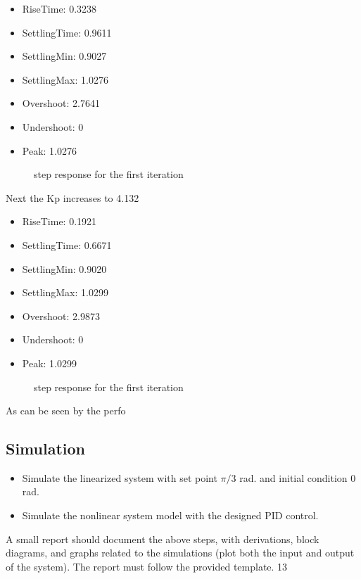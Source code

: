\documentclass[12pt]{article}
\begin{document}
\begin{itemize}
  \item RiseTime: 0.3238
  \item SettlingTime: 0.9611
  \item SettlingMin: 0.9027
  \item SettlingMax: 1.0276
  \item Overshoot: 2.7641
  \item Undershoot: 0
  \item Peak: 1.0276
\end{itemize}
\begin{figure}[htbp]
  \centering
  
  \caption{step response for the first iteration} \label{my_first_step}
\end{figure}
Next the Kp increases to 4.132
\begin{itemize}
  \item RiseTime: 0.1921
  \item SettlingTime: 0.6671
  \item SettlingMin: 0.9020
  \item SettlingMax: 1.0299
  \item Overshoot: 2.9873
  \item Undershoot: 0
  \item Peak: 1.0299
\end{itemize}
\begin{figure}[htbp]
  \centering
  
  \caption{step response for the first iteration} \label{my_second_step}
\end{figure}
As can be seen by the perfo
\subsection*{Simulation}

\begin{itemize}
  \item Simulate the linearized system with set point $\pi/3$ rad. and initial condition 0 rad.
  \item Simulate the nonlinear system model with the designed PID control.
\end{itemize}

A small report should document the above steps, with derivations, block diagrams, and graphs related
to the simulations (plot both the input and output of the system). The report must follow the provided
template.
13
\end{document}
